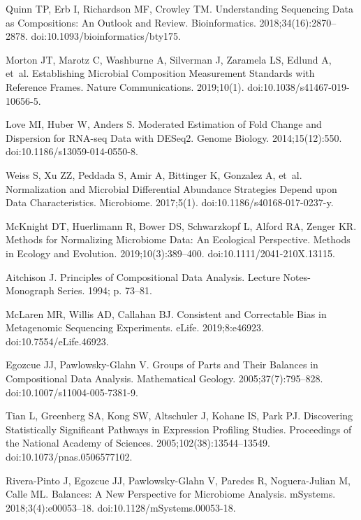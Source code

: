 \documentclass[10pt,letterpaper]{article}
\begin{document}
\begin{thebibliography}{10}
Quinn TP, Erb I, Richardson MF, Crowley TM.
\newblock Understanding Sequencing Data as Compositions: An Outlook and Review.
\newblock Bioinformatics. 2018;34(16):2870--2878.
\newblock doi:{10.1093/bioinformatics/bty175}.

Morton JT, Marotz C, Washburne A, Silverman J, Zaramela LS, Edlund A, et~al.
\newblock Establishing Microbial Composition Measurement Standards with
  Reference Frames.
\newblock Nature Communications. 2019;10(1).
\newblock doi:{10.1038/s41467-019-10656-5}.

Love MI, Huber W, Anders S.
\newblock Moderated Estimation of Fold Change and Dispersion for {{RNA-seq}}
  Data with {{DESeq2}}.
\newblock Genome Biology. 2014;15(12):550.
\newblock doi:{10.1186/s13059-014-0550-8}.

Weiss S, Xu ZZ, Peddada S, Amir A, Bittinger K, Gonzalez A, et~al.
\newblock Normalization and Microbial Differential Abundance Strategies Depend
  upon Data Characteristics.
\newblock Microbiome. 2017;5(1).
\newblock doi:{10.1186/s40168-017-0237-y}.

McKnight DT, Huerlimann R, Bower DS, Schwarzkopf L, Alford RA, Zenger KR.
\newblock Methods for Normalizing Microbiome Data: {{An}} Ecological
  Perspective.
\newblock Methods in Ecology and Evolution. 2019;10(3):389--400.
\newblock doi:{10.1111/2041-210X.13115}.

Aitchison J.
\newblock Principles of Compositional Data Analysis.
\newblock Lecture Notes-Monograph Series. 1994; p. 73--81.

McLaren MR, Willis AD, Callahan BJ.
\newblock Consistent and Correctable Bias in Metagenomic Sequencing
  Experiments.
\newblock eLife. 2019;8:e46923.
\newblock doi:{10.7554/eLife.46923}.

Egozcue JJ, {Pawlowsky-Glahn} V.
\newblock Groups of {{Parts}} and {{Their Balances}} in {{Compositional Data
  Analysis}}.
\newblock Mathematical Geology. 2005;37(7):795--828.
\newblock doi:{10.1007/s11004-005-7381-9}.

Tian L, Greenberg SA, Kong SW, Altschuler J, Kohane IS, Park PJ.
\newblock Discovering Statistically Significant Pathways in Expression
  Profiling Studies.
\newblock Proceedings of the National Academy of Sciences.
  2005;102(38):13544--13549.
\newblock doi:{10.1073/pnas.0506577102}.

{Rivera-Pinto} J, Egozcue JJ, {Pawlowsky-Glahn} V, Paredes R, {Noguera-Julian}
  M, Calle ML.
\newblock Balances: A {{New Perspective}} for {{Microbiome Analysis}}.
\newblock mSystems. 2018;3(4):e00053--18.
\newblock doi:{10.1128/mSystems.00053-18}.


\end{thebibliography}
\end{document}
